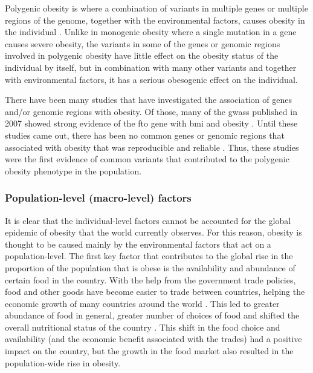Polygenic obesity is where a combination of variants in multiple genes or multiple regions of the genome, together with the environmental factors, causes obesity in the individual \citep{Moustafa2013}.
Unlike in monogenic obesity where a single mutation in a gene causes severe obesity, the variants in some of the genes or genomic regions involved in polygenic obesity have little effect on the obesity status of the individual by itself, but in combination with many other variants and together with environmental factors, it has a serious obesogenic effect on the individual.

There have been many studies that have investigated the association of genes and/or genomic regions with obesity.
Of those, many of the \glspl{gwas} published in 2007 showed strong evidence of the \gls{fto} gene with \gls{bmi} and obesity  \citep{Dina2007,Frayling2007,Gerken2007,Scuteri2007}.
Until these studies came out, there has been no common genes or genomic regions that associated with obesity that was reproducible and reliable \citep{Frayling2007}.
Thus, these studies were the first evidence of common variants that contributed to the polygenic obesity phenotype in the population.

\subsubsection{Population-level (macro-level) factors}
\label{ssub:Population-level_(macro-level)_factors}

It is clear that the individual-level factors cannot be accounted for the global epidemic of obesity that the world currently observes.
For this reason, obesity is thought to be caused mainly by the environmental factors that act on a population-level.
The first key factor that contributes to the global rise in the proportion of the population that is obese is the availability and abundance of certain food in the country.
With the help from the government trade policies, food and other goods have become easier to trade between countries, helping the economic growth of many countries around the world \citep{Kearney2010}.
This led to greater abundance of food in general, greater number of choices of food and shifted the overall nutritional status of the country \citep{Malik2013}.
This shift in the food choice and availability (and the economic benefit associated with the trades) had a positive impact on the country, but the growth in the food market also resulted in the population-wide rise in obesity.

